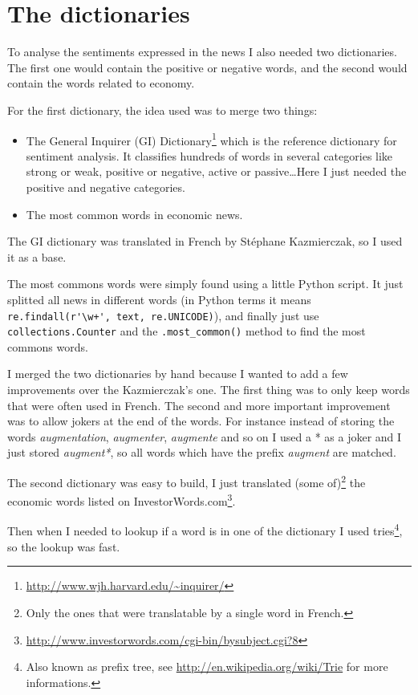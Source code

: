 \documentclass[12pt]{report}
\begin{document}
		\section{The dictionaries}

			To analyse the sentiments expressed in the news I also needed two dictionaries. The first one would contain the positive or negative words, and the second would contain the words related to economy.

			For the first dictionary, the idea used was to merge two things:
			\begin{itemize}
				\item The General Inquirer (GI) Dictionary\footnote{\url{http://www.wjh.harvard.edu/~inquirer/}} which is the reference dictionary for sentiment analysis. It classifies hundreds of words in several categories like strong or weak, positive or negative, active or passive\ldots Here I just needed the positive and negative categories.
				\item The most common words in economic news.
			\end{itemize}

			The GI dictionary was translated in French by Stéphane Kazmierczak, so I used it as a base.

			The most commons words were simply found using a little Python script. It just splitted all news in different words (in Python terms it means \lstinline!re.findall(r'\w+', text, re.UNICODE)!), and finally just use \lstinline!collections.Counter! and the \lstinline!.most_common()! method to find the most commons words.

			I merged the two dictionaries by hand because I wanted to add a few improvements over the Kazmierczak's one. The first thing was to only keep words that were often used in French. The second and more important improvement was to allow jokers at the end of the words. For instance instead of storing the words \emph{augmentation}, \emph{augmenter}, \emph{augmente} and so on I used a * as a joker and I just stored \emph{augment*}, so all words which have the prefix \emph{augment} are matched.

			The second dictionary was easy to build, I just translated (some of)\footnote{Only the ones that were translatable by a single word in French.} the economic words listed on InvestorWords.com\footnote{\url{http://www.investorwords.com/cgi-bin/bysubject.cgi?8}}.

			Then when I needed to lookup if a word is in one of the dictionary I used tries\footnote{Also known as prefix tree, see \url{http://en.wikipedia.org/wiki/Trie} for more informations.}, so the lookup was fast.
\end{document}
